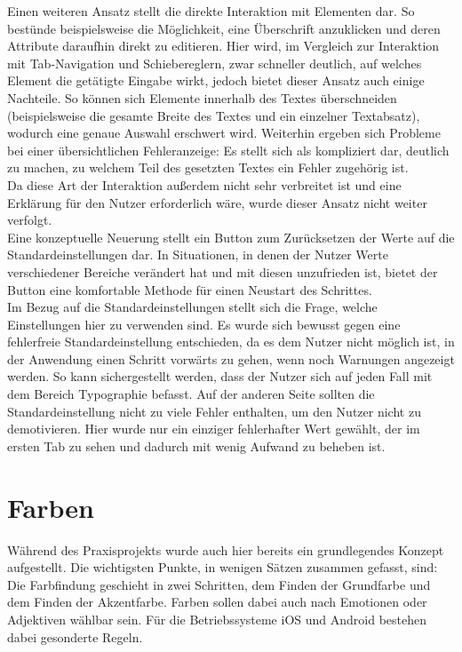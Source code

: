 Einen weiteren Ansatz stellt die direkte Interaktion mit Elementen dar. So bestünde beispielsweise die Möglichkeit, eine Überschrift anzuklicken und deren Attribute daraufhin direkt zu editieren. Hier wird, im Vergleich zur Interaktion mit Tab-Navigation und Schiebereglern, zwar schneller deutlich, auf welches Element die getätigte Eingabe wirkt, jedoch bietet dieser Ansatz auch einige Nachteile. So können sich Elemente innerhalb des Textes überschneiden (beispielsweise die gesamte Breite des Textes und ein einzelner Textabsatz), wodurch eine genaue Auswahl erschwert wird. Weiterhin ergeben sich Probleme bei einer übersichtlichen Fehleranzeige: Es stellt sich als kompliziert dar, deutlich zu machen, zu welchem Teil des gesetzten Textes ein Fehler zugehörig ist.\\
Da diese Art der Interaktion außerdem nicht sehr verbreitet ist und eine Erklärung für den Nutzer erforderlich wäre, wurde dieser Ansatz nicht weiter verfolgt.\\

Eine konzeptuelle Neuerung stellt ein Button zum Zurücksetzen der Werte auf die Standardeinstellungen dar. In Situationen, in denen der Nutzer Werte verschiedener Bereiche verändert hat und mit diesen unzufrieden ist, bietet der Button eine komfortable Methode für einen Neustart des Schrittes.\\
Im Bezug auf die Standardeinstellungen stellt sich die Frage, welche Einstellungen hier zu verwenden sind. Es wurde sich bewusst gegen eine fehlerfreie Standardeinstellung entschieden, da es dem Nutzer nicht möglich ist, in der Anwendung einen Schritt vorwärts zu gehen, wenn noch Warnungen angezeigt werden. So kann sichergestellt werden, dass der Nutzer sich auf jeden Fall mit dem Bereich Typographie befasst.
Auf der anderen Seite sollten die Standardeinstellung nicht zu viele Fehler enthalten, um den Nutzer nicht zu demotivieren. Hier wurde nur ein einziger fehlerhafter Wert gewählt, der im ersten Tab zu sehen und dadurch mit wenig Aufwand zu beheben ist.\\

\section{Farben}
Während des Praxisprojekts wurde auch hier bereits ein grundlegendes Konzept aufgestellt. Die wichtigsten Punkte, in wenigen Sätzen zusammen gefasst, sind:\\
Die Farbfindung geschieht in zwei Schritten, dem Finden der Grundfarbe und dem Finden der Akzentfarbe. Farben sollen dabei auch nach Emotionen oder Adjektiven wählbar sein. Für die Betriebssysteme iOS und Android bestehen dabei gesonderte Regeln. \cite{PoplawskiPP}

